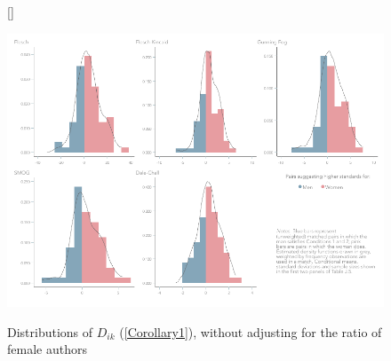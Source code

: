 \begin{figure}[H]
	
	[\FBwidth]
	{
		\caption{Distributions of \(D_{ik}\) (\autoref{Corollary1}), without adjusting for the ratio of female authors}\label{figure8_R}
	}
	{
		\includegraphics[width=12.3cm]{0-images/generated/Figure-5-R.pdf}
	}
\end{figure}